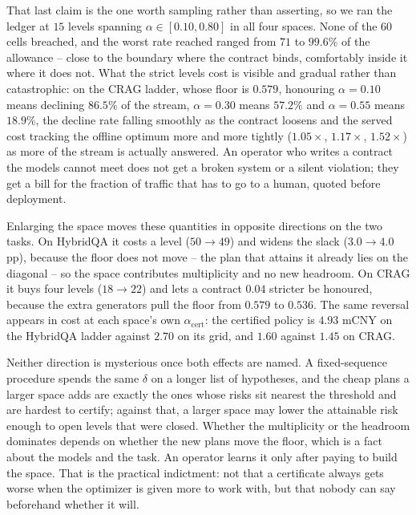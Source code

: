 That last claim is the one worth sampling rather than asserting, so we
ran the ledger at $15$ levels spanning $\alpha \in [0.10, 0.80]$ in all
four spaces. None of the $60$ cells breached, and the worst rate reached
ranged from $71$ to $99.6\%$ of the allowance -- close to the boundary
where the contract binds, comfortably inside it where it does not. What
the strict levels cost is visible and gradual rather than catastrophic:
on the CRAG ladder, whose floor is $0.579$, honouring $\alpha = 0.10$
means declining $86.5\%$ of the stream, $\alpha = 0.30$ means $57.2\%$
and $\alpha = 0.55$ means $18.9\%$, the decline rate falling smoothly as
the contract loosens and the served cost tracking the offline optimum
more and more tightly ($1.05\times$, $1.17\times$, $1.52\times$) as more
of the stream is actually answered. An operator who writes a contract
the models cannot meet does not get a broken system or a silent
violation; they get a bill for the fraction of traffic that has to go to
a human, quoted before deployment.

Enlarging the space moves these quantities in opposite directions on the
two tasks. On HybridQA it costs a level ($50 \to 49$) and widens the
slack ($3.0 \to 4.0$ pp), because the floor does not move --
the plan that attains it already lies on the diagonal -- so the space
contributes multiplicity and no new headroom. On CRAG it buys four
levels ($18 \to 22$) and lets a contract $0.04$ stricter be honoured,
because the extra generators pull the floor from $0.579$ to $0.536$. The
same reversal appears in cost at each space's own $\alpha_{\mathrm{cert}}$:
the certified policy is $4.93$ mCNY on the HybridQA ladder against
$2.70$ on its grid, and $1.60$ against $1.45$ on CRAG.

Neither direction is mysterious once both effects are named. A
fixed-sequence procedure spends the same $\delta$ on a longer list of
hypotheses, and the cheap plans a larger space adds are exactly the ones
whose risks sit nearest the threshold and are hardest to certify; against
that, a larger space may lower the attainable risk enough to open levels
that were closed. Whether the multiplicity or the headroom dominates
depends on whether the new plans move the floor, which is a fact about
the models and the task. An operator learns it only after paying to
build the space. That is the practical indictment: not that a
certificate always gets worse when the optimizer is given more to work
with, but that nobody can say beforehand whether it will.

